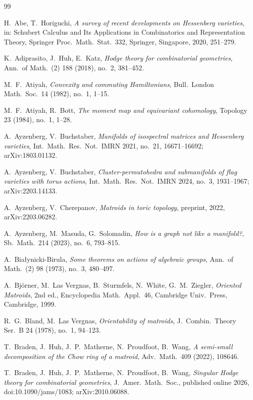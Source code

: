 \documentclass[11pt,a4paper]{article}
\numberwithin{equation}{section}
\theoremstyle{plain}
\theoremstyle{definition}
\theoremstyle{remark}
\begin{document}
\begin{thebibliography}{99}\small

 H.~Abe, T.~Horiguchi, \emph{A survey of recent developments on Hessenberg varieties}, in: Schubert Calculus and Its Applications in Combinatorics and Representation Theory, Springer Proc.\ Math.\ Stat.\ 332, Springer, Singapore, 2020, 251--279.

 K.~Adiprasito, J.~Huh, E.~Katz, \emph{Hodge theory for combinatorial geometries}, Ann.\ of Math.\ (2) 188 (2018), no.~2, 381--452.

 M.~F.~Atiyah, \emph{Convexity and commuting Hamiltonians}, Bull.\ London Math.\ Soc.\ 14 (1982), no.~1, 1--15.

 M.~F.~Atiyah, R.~Bott, \emph{The moment map and equivariant cohomology}, Topology 23 (1984), no.~1, 1--28.

 A.~Ayzenberg, V.~Buchstaber, \emph{Manifolds of isospectral matrices and Hessenberg varieties}, Int.\ Math.\ Res.\ Not.\ IMRN 2021, no.~21, 16671--16692; arXiv:1803.01132.

 A.~Ayzenberg, V.~Buchstaber, \emph{Cluster-permutohedra and submanifolds of flag varieties with torus actions}, Int.\ Math.\ Res.\ Not.\ IMRN 2024, no.~3, 1931--1967; arXiv:2203.14133.

 A.~Ayzenberg, V.~Cherepanov, \emph{Matroids in toric topology}, preprint, 2022, arXiv:2203.06282.

 A.~Ayzenberg, M.~Masuda, G.~Solomadin, \emph{How is a graph not like a manifold?}, Sb.\ Math.\ 214 (2023), no.~6, 793--815.

 A.~Białynicki-Birula, \emph{Some theorems on actions of algebraic groups}, Ann.\ of Math.\ (2) 98 (1973), no.~3, 480--497.

 A.~Björner, M.~Las Vergnas, B.~Sturmfels, N.~White, G.~M.~Ziegler, \emph{Oriented Matroids}, 2nd ed., Encyclopedia Math.\ Appl.\ 46, Cambridge Univ.\ Press, Cambridge, 1999.

 R.~G.~Bland, M.~Las Vergnas, \emph{Orientability of matroids}, J.\ Combin.\ Theory Ser.\ B 24 (1978), no.~1, 94--123.

 T.~Braden, J.~Huh, J.~P.~Matherne, N.~Proudfoot, B.~Wang, \emph{A semi-small decomposition of the Chow ring of a matroid}, Adv.\ Math.\ 409 (2022), 108646.

 T.~Braden, J.~Huh, J.~P.~Matherne, N.~Proudfoot, B.~Wang, \emph{Singular Hodge theory for combinatorial geometries}, J.\ Amer.\ Math.\ Soc., published online 2026, doi:10.1090/jams/1083; arXiv:2010.06088.


\end{thebibliography}
\end{document}
